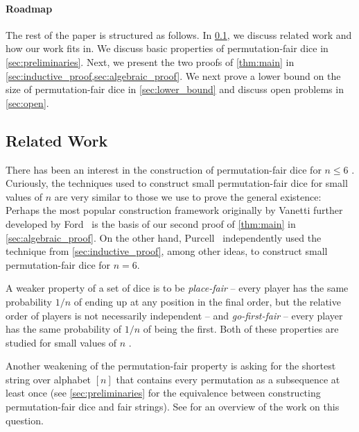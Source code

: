 \documentclass{article}
\begin{document}
\paragraph{Roadmap}
The rest of the paper is structured as follows. In \cref{sec:related_work}, we discuss related work and how our work fits in. We discuss basic properties of permutation-fair dice in \cref{sec:preliminaries}. Next, we present the two proofs of \cref{thm:main} in \cref{sec:inductive_proof,sec:algebraic_proof}. We next prove a lower bound on the size of permutation-fair dice in \cref{sec:lower_bound} and discuss open problems in \cref{sec:open}. 

\subsection{Related Work}
\label{sec:related_work}

There has been an interest in the construction of permutation-fair dice for $n \le 6$ \cite{Eric_webpage,harshbarger2012whogoesfirst,ford2023go,purcell_improved}. 
Curiously, the techniques used to construct small permutation-fair dice for small values of $n$ are very similar to those we use to prove the general existence: Perhaps the most popular construction framework originally by Vanetti further developed by Ford~\cite{ford2023go} is the basis of our second proof of \cref{thm:main} in \cref{sec:algebraic_proof}. On the other hand, Purcell~\cite{purcell_improved} independently used the technique from \cref{sec:inductive_proof}, among other ideas, to construct small permutation-fair dice for $n = 6$. 

A weaker property of a set of dice is to be \emph{place-fair} -- every player has the same probability $1/n$ of ending up at any position in the final order, but the relative order of players is not necessarily independent -- and \emph{go-first-fair} -- every player has the same probability of $1/n$ of being the first. Both of these properties are studied for small values of $n$ \cite{Eric_webpage,ford2023go}. 

Another weakening of the permutation-fair property is asking for the shortest string over alphabet $[n]$ that contains every permutation as a subsequence at least once \cite{chvatal1972selected,newey1973notes,adleman1974short,koutas1975shortest,galbiati1976permutation,zualinescu2011shorter,kleitman1976lower,radomirovic2012construction} (see \cref{sec:preliminaries} for the equivalence between constructing permutation-fair dice and fair strings). See \cite[Section 4]{engen2020containing} for an overview of the work on this question. 
\end{document}
